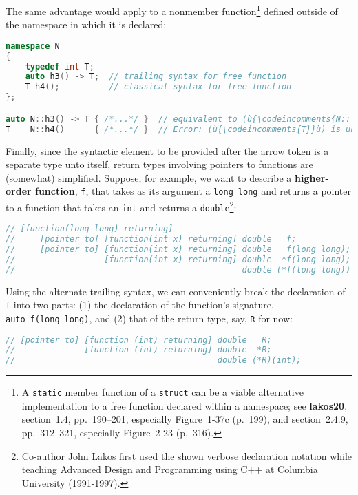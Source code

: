\noindent The same advantage would apply to a nonmember
function{\cprotect\footnote{A \texttt{static} member function of a
\texttt{struct} can be a viable alternative implementation to a free
function declared within a namespace; see \textbf{lakos20}, section~1.4,
pp.~190--201, especially Figure~1-37c (p.~199), and section~2.4.9, pp.~312--321, especially Figure~2-23 (p.~316).}} defined outside of the namespace in
which it is declared:

\begin{lstlisting}[language=C++]
namespace N
{
    typedef int T;
    auto h3() -> T;  // trailing syntax for free function
    T h4();          // classical syntax for free function
};

auto N::h3() -> T { /*...*/ }  // equivalent to (ù{\codeincomments{N::T N::h3() \{ /\*...\*/ \}}}ù)
T    N::h4()      { /*...*/ }  // Error: (ù{\codeincomments{T}}ù) is unknown in this context.
\end{lstlisting}
    

Finally, since the syntactic element to be provided after the arrow
token is a separate type unto itself, return types involving pointers to
functions are (somewhat) simplified. Suppose, for example, we want to
describe a \textbf{higher-order function}, \texttt{f}, that takes as its
argument a \texttt{long}~\texttt{long} and returns a pointer to a
function that takes an \texttt{int} and returns a
\texttt{double}{\cprotect\footnote{Co-author John Lakos first used the shown verbose declaration notation
while teaching Advanced Design and Programming using C++ at Columbia
  University (1991-1997).}}:

\begin{lstlisting}[language=C++]
// [function(long long) returning]
//     [pointer to] [function(int x) returning] double   f;
//     [pointer to] [function(int x) returning] double   f(long long);
//                  [function(int x) returning] double  *f(long long);
//                                              double (*f(long long))(int x);
\end{lstlisting}
    
\noindent Using the alternate trailing syntax, we can conveniently break the
declaration of \texttt{f} into two parts: (1) the declaration of the
function's signature, \texttt{auto}~\texttt{f(long}~\texttt{long)}, and (2) that of the return type, say, \texttt{R} for now:

\begin{lstlisting}[language=C++]
// [pointer to] [function (int) returning] double   R;
//              [function (int) returning] double  *R;
//                                         double (*R)(int);
\end{lstlisting}
    
